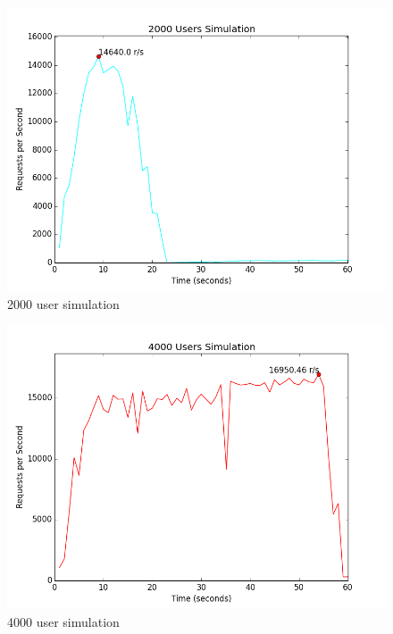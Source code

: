 \documentclass{article}
\begin{document}
\begin{figure}[H]
  \centering
  \includegraphics[scale=0.5]{diagrams/rps-2000.png}
  \caption{2000 user simulation}
\end{figure}

\begin{figure}[H]
  \centering
  \includegraphics[scale=0.5]{diagrams/rps-4000.png}
  \caption{4000 user simulation}
\end{figure}
\end{document}
